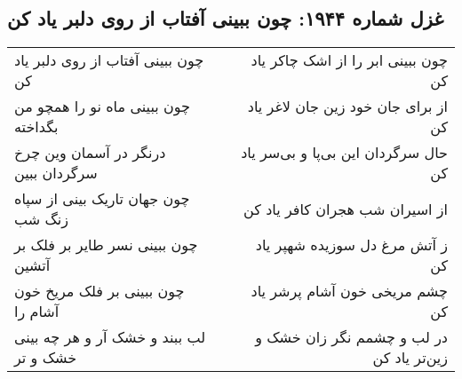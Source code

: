 \begin{center}
\section*{غزل شماره ۱۹۴۴: چون ببینی آفتاب از روی دلبر یاد کن}
\label{sec:1944}
\begin{longtable}{l p{0.5cm} r}
چون ببینی آفتاب از روی دلبر یاد کن
&&
چون ببینی ابر را از اشک چاکر یاد کن
\\
چون ببینی ماه نو را همچو من بگداخته
&&
از برای جان خود زین جان لاغر یاد کن
\\
درنگر در آسمان وین چرخ سرگردان ببین
&&
حال سرگردان این بی‌پا و بی‌سر یاد کن
\\
چون جهان تاریک بینی از سپاه زنگ شب
&&
از اسیران شب هجران کافر یاد کن
\\
چون ببینی نسر طایر بر فلک بر آتشین
&&
ز آتش مرغ دل سوزیده شهپر یاد کن
\\
چون ببینی بر فلک مریخ خون آشام را
&&
چشم مریخی خون آشام پرشر یاد کن
\\
لب ببند و خشک آر و هر چه بینی خشک و تر
&&
در لب و چشمم نگر زان خشک و زین‌تر یاد کن
\\
\end{longtable}
\end{center}

